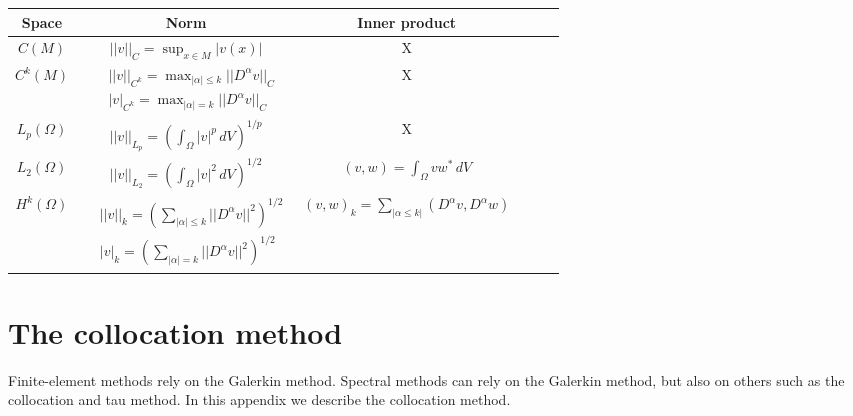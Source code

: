 \documentclass[oneside,a4paper,11pt]{report}
\begin{document}
\begin{center}
\begin{tabular}{Sc|Sc|Sc}
    Space & Norm & Inner product \\
    \hline
    $C(M)$ & $ \displaystyle ||v||_C = \sup_{x \in M} |v(x)| $ & X \\
    \hline
    $C^k(M)$ & $\begin{aligned} &||v||_{C^k} = \max_{|\alpha| \le k} ||D^\alpha v||_C \\ &|v|_{C^k}=\max_{|\alpha| = k} ||D^\alpha v||_C \end{aligned}$ & X \\
    \hline
    $L_p(\Omega)$ & $ \displaystyle ||v||_{L_p} = \left ( \int_\Omega |v|^p \, dV \right)^{1/p} $ & X \\
    \hline
    $L_2(\Omega)$ & $ \displaystyle ||v||_{L_2} = \left ( \int_\Omega |v|^2 \, dV \right)^{1/2} $ & $ \displaystyle (v,w) = \int_\Omega vw^* \, dV $ \\
    \hline
    $H^k(\Omega)$ & $ \begin{aligned} &||v||_k = \left ( \sum_{|\alpha| \le k} ||D^\alpha v||^2 \right )^{1/2} \\ &|v|_k = \left ( \sum_{|\alpha| = k} ||D^\alpha v||^2 \right )^{1/2} \end{aligned}$ & $ \displaystyle (v,w)_k = \sum_{|\alpha \le k|} (D^\alpha v, D^\alpha w) $
\end{tabular}
\end{center}

\chapter{The collocation method}
\label{sec:collocation_method}
Finite-element methods rely on the Galerkin method. Spectral methods can rely on the Galerkin method, but also on others such as the collocation and tau method. In this appendix we describe the collocation method.
\end{document}

